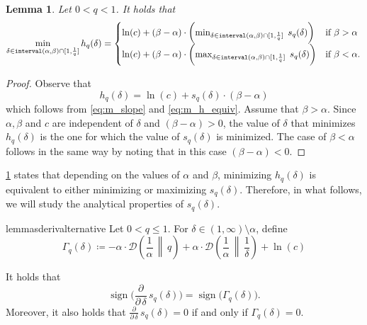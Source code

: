 \documentclass[letterpaper,11pt]{article}
\DeclareMathOperator{\sign}{sign}
\newcommand{\1}[1]{\mathds{1}\left[#1\right]}
\newcommand{\D}[2]{\mathcal{D}\left(#1\, \middle\|\,#2 \right)}
\newcommand{\goodd}{\textnormal{\texttt{interval}}(\alpha, \beta)}
\newtheorem{lemma}[theorem]{Lemma}
\begin{document}
\begin{lemma}\label{lemma:minim_h_slope}
	Let $0 < q < 1$. It holds that
	\begin{equation*}
		\min_{\delta \in \goodd \cap [1,\frac{1}{q}]} h_{q}(\delta) = \begin{cases}
		\ln(c) + (\beta - \alpha) \cdot \biggl(\min_{\delta \in \goodd \cap [1,\frac{1}{q}]} \;s_q(\delta)\biggr) &\text{if } \beta > \alpha \\
		\ln(c) + (\beta - \alpha) \cdot \biggl(\max_{\delta \in \goodd \cap [1,\frac{1}{q}]} \;s_q(\delta)\biggr) &\text{if } \beta < \alpha.	
	\end{cases}  
	\end{equation*}
\end{lemma}

\begin{proof}
	Observe that
	\begin{equation*}
		h_{q}(\delta) = \ln(c) + s_{q}(\delta) \cdot (\beta - \alpha)
	\end{equation*}
	which follows from \eqref{eq:m_slope} and \eqref{eq:m_h_equiv}.
	Assume that $\beta > \alpha$.
	Since $\alpha, \beta$ and $c$ are independent of $\delta$ and $(\beta -\alpha) > 0$,
	the value of $\delta$ that minimizes $h_{q}(\delta)$
	is the one for which the value of $s_q(\delta)$ is minimized.
	The case of $\beta < \alpha$ follows in the same way by noting that in this case
	$(\beta - \alpha) < 0$.
\end{proof}

\cref{lemma:minim_h_slope} states that depending on the values of $\alpha$ and $\beta$,
minimizing $h_{q}(\delta)$ is equivalent to either minimizing
or maximizing $s_q(\delta)$.
Therefore, in what follows, we will study the analytical properties of
$s_q(\delta)$.

\begin{restatable}{lemma}{sderivalternative}
	\label{lemma:s_deriv_alternative}
	Let $0 < q \leq 1$.
	For $\delta \in (1,\infty)\setminus{\alpha}$, define
	\begin{equation*}
		\Gamma_q(\delta) \coloneqq 
			-\alpha \cdot \D{\frac{1}{\alpha}}{q} +  \alpha \cdot \D{\frac{1}{\alpha}}{\frac{1}{\delta}} + \ln(c) 
	\end{equation*}

	It holds that
	\begin{equation}\label{eq:s_deriv_sign}
		\sign\biggl(\frac{\partial}{\partial\,\delta}\,s_{q}(\delta)\biggr) = \sign\biggl(\Gamma_q(\delta)\biggr).
	\end{equation}
	Moreover, it also holds that
	$\frac{\partial}{\partial\,\delta}\,s_{q}(\delta) = 0$ if and only if $\Gamma_q(\delta) = 0$.	
\end{restatable}
\end{document}
